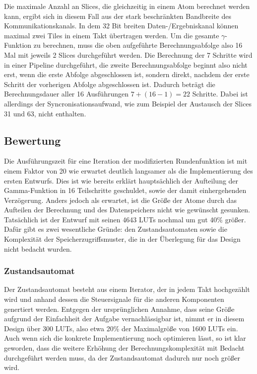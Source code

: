 Die maximale Anzahl an Slices, die gleichzeitig in einem Atom berechnet werden kann, ergibt sich in diesem Fall aus der stark beschränkten Bandbreite
des Kommunikationskanals. In dem 32 Bit breiten Daten-/Ergebniskanal können maximal zwei Tiles in einem Takt übertragen werden.
Um die gesamte $\gamma$-Funktion zu berechnen, muss die oben aufgeführte Berechnungsabfolge also 16 Mal mit jeweils 2 Slices durchgeführt werden.
Die Berechnung der 7 Schritte wird in einer Pipeline durchgeführt, die zweite Berechnungsabfolge beginnt also nicht erst, wenn die erste Abfolge abgeschlossen ist,
sondern direkt, nachdem der erste Schritt der vorherigen Abfolge abgeschlossen ist. Dadurch beträgt die Berechnungsdauer aller 16 Ausführungen
$7 + (16 - 1) = 22$ Schritte. Dabei ist allerdings der Syncronisationsaufwand, wie zum Beispiel der Austausch der Slices 31 und 63, nicht enthalten.

\subsection{Bewertung}
Die Ausführungszeit für eine Iteration der modifizierten Rundenfunktion ist mit einem Faktor von 20 wie erwartet deutlich langsamer als die Implementierung des ersten Entwurfs.
Dies ist wie bereits erklärt hauptsächlich der Aufteilung der Gamma-Funktion in 16 Teilschritte geschuldet, sowie der damit einhergehenden Verzögerung.
Anders jedoch als erwartet, ist die Größe der Atome durch das Aufteilen der Berechnung und des Datenspeichers nicht wie gewünscht gesunken.
Tatsächlich ist der Entwurf mit seinen 4643 LUTs nochmal um gut 40\% größer. Dafür gibt es zwei wesentliche Gründe: den Zustandsautomaten
sowie die Komplexität der Speicherzugriffsmuster, die in der Überlegung für das Design nicht bedacht wurden.

\subsubsection{Zustandsautomat}
Der Zustandsautomat besteht aus einem Iterator, der in jedem Takt hochgezählt wird und anhand dessen die Steuersignale für die anderen Komponenten genertiert werden.
Entgegen der ursprünglichen Annahme, dass seine Größe aufgrund der Einfachheit der Aufgabe vernachlässigbar ist, nimmt er in diesem Design über 300 LUTs,
also etwa 20\% der Maximalgröße von 1600 LUTs ein. Auch wenn sich die konkrete Implementierung noch optimieren lässt, so ist klar geworden,
dass die weitere Erhöhung der Berechnungskomplexität mit Bedacht durchgeführt werden muss, da der Zustandsautomat dadurch nur noch größer wird.


